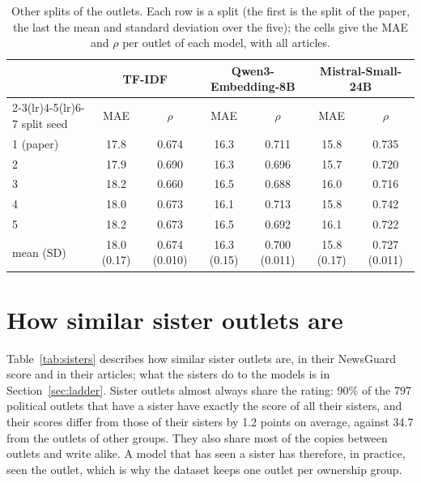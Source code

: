 \documentclass[11pt,a4paper]{article}
\begin{document}
\begin{table}[h]
\centering
\caption{Other splits of the outlets. Each row is a split (the first is the split of the paper, the last the mean and
standard deviation over the five); the cells give the MAE and $\rho$ per outlet of each model, with all
articles.}\label{tab:splits}
\small\setlength{\tabcolsep}{4pt}
\begin{tabular}{lcccccc}
\toprule
& \multicolumn{2}{c}{TF-IDF} & \multicolumn{2}{c}{Qwen3-Embedding-8B} & \multicolumn{2}{c}{Mistral-Small-24B} \\
\cmidrule(lr){2-3}\cmidrule(lr){4-5}\cmidrule(lr){6-7}
split seed & MAE & $\rho$ & MAE & $\rho$ & MAE & $\rho$ \\
\midrule
1 (paper) & 17.8 & 0.674 & 16.3 & 0.711 & 15.8 & 0.735 \\
2 & 17.9 & 0.690 & 16.3 & 0.696 & 15.7 & 0.720 \\
3 & 18.2 & 0.660 & 16.5 & 0.688 & 16.0 & 0.716 \\
4 & 18.0 & 0.673 & 16.1 & 0.713 & 15.8 & 0.742 \\
5 & 18.2 & 0.673 & 16.5 & 0.692 & 16.1 & 0.722 \\
\midrule
mean (SD) & 18.0 (0.17) & 0.674 (0.010) & 16.3 (0.15) & 0.700 (0.011) & 15.8 (0.17) & 0.727 (0.011) \\
\bottomrule
\end{tabular}
\end{table}

\section{How similar sister outlets are}\label{app:sisters}
Table~\ref{tab:sisters} describes how similar sister outlets are, in their NewsGuard score and in their articles; what
the sisters do to the models is in Section~\ref{sec:ladder}. Sister outlets almost always share the rating: 90\% of
the 797 political outlets that have a sister have exactly the score of all their sisters, and their scores differ from
those of their sisters by 1.2 points on average, against 34.7 from the outlets of other groups. They also share most of
the copies between outlets and write alike. A model that has seen a sister has therefore, in practice, seen the outlet,
which is why the dataset keeps one outlet per ownership group.
\end{document}
